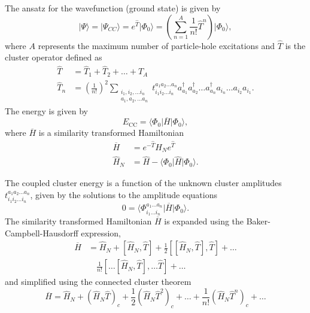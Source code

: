 \documentclass[%
oneside,                 %
final,                   %
10pt]{article}
\begin{document}
The ansatz for the wavefunction (ground state) is given by
\begin{equation*}
   \vert \Psi\rangle = \vert \Psi_{CC}\rangle = e^{\hat{T}} \vert \Phi_0\rangle =  
  \left( \sum_{n=1}^{A} \frac{1}{n!} \hat{T}^n \right) \vert \Phi_0\rangle,
\end{equation*}
where $A$ represents the maximum number of particle-hole excitations and $\hat{T}$ is the cluster operator defined as
\begin{align*}
            \hat{T} &= \hat{T}_1 + \hat{T}_2 + \ldots + \hat{T}_A \\
            \hat{T}_n &= \left(\frac{1}{n!}\right)^2 
                \sum_{\substack{
                        i_1,i_2,\ldots i_n \\
                        a_1,a_2,\ldots a_n}}
                t_{i_1i_2\ldots i_n}^{a_1a_2\ldots a_n} a_{a_1}^\dagger a_{a_2}^\dagger \ldots a_{a_n}^\dagger a_{i_n} \ldots a_{i_2} a_{i_1}.
        \end{align*}
    The energy is given by
    \begin{equation*}
        E_{\mathrm{CC}} = \langle\Phi_0\vert  \overline{H}\vert \Phi_0\rangle,
    \end{equation*}
    where $\overline{H}$ is a similarity transformed Hamiltonian
    \begin{align*}
        \overline{H}&= e^{-\hat{T}} \hat{H}_N e^{\hat{T}} \\
        \hat{H}_N &= \hat{H} - \langle\Phi_0\vert \hat{H} \vert \Phi_0\rangle.
    \end{align*}

    The coupled cluster energy is a function of the unknown cluster amplitudes $t_{i_1i_2\ldots i_n}^{a_1a_2\ldots a_n}$,
given by the solutions to the amplitude equations
    \begin{equation*}
        0 = \langle\Phi_{i_1 \ldots i_n}^{a_1 \ldots a_n}\vert \overline{H}\vert \Phi_0\rangle.
    \end{equation*}
The similarity transformed   Hamiltonian  $\overline{H}$ is expanded using the Baker-Campbell-Hausdorff expression,
    \begin{align*}
        \overline{H}&= \hat{H}_N + \left[ \hat{H}_N, \hat{T} \right] + 
            \frac{1}{2} \left[\left[ \hat{H}_N, \hat{T} \right], \hat{T}\right] + \ldots \\
            & \quad \frac{1}{n!} \left[ \ldots \left[ \hat{H}_N, \hat{T} \right], \ldots \hat{T} \right] +\dots
    \end{align*}
and simplified using the connected cluster theorem
    \begin{equation*}
        \overline{H}= \hat{H}_N + \left( \hat{H}_N \hat{T}\right)_c + \frac{1}{2} \left( \hat{H}_N \hat{T}^2\right)_c
            + \dots + \frac{1}{n!} \left( \hat{H}_N \hat{T}^n\right)_c +\dots
    \end{equation*}
\end{document}
